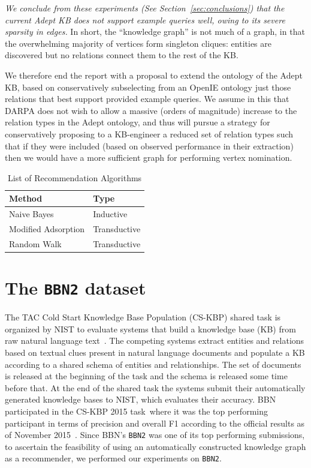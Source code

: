 \documentclass[paper=a4,fontsize=11pt]{scrartcl}
\newcommand{\Secref}[1]{Section~\ref{#1}}
\numberwithin{equation}{section}    %
\numberwithin{figure}{section}      %
\numberwithin{table}{section}       %
\newcommand{\dataset}[0]{\texttt{BBN2} dataset\ }
\newcommand{\task}{CS-KBP 2015 task\ }
\begin{document}
\emph{We conclude from these experiments (See
  \Secref{sec:conclusions}) that the current Adept KB does not support
  example queries well, owing to its severe sparsity in edges.} In
short, the ``knowledge graph'' is not much of a graph, in that the
overwhelming majority of vertices form singleton cliques: entities are
discovered but no relations connect them to the rest of the KB.

We therefore end the report with a proposal to extend the ontology of
the Adept KB, based on conservatively subselecting from an OpenIE
ontology just those relations that best support provided example
queries. We assume in this that DARPA does not wish to allow a
massive (orders of magnitude) increase to the relation types in the
Adept ontology, and thus will pursue a strategy for conservatively
proposing to a KB-engineer a reduced set of relation types such that
if they were included (based on observed performance in their
extraction) then we would have a more sufficient graph for performing
vertex nomination.
\begin{table}[htbp]
  \centering
  \begin{tabular}{l l}
    Method              & Type         \\\hline
    Naive Bayes         & Inductive    \\
    Modified Adsorption & Transductive \\
    Random Walk         & Transductive \\
  \end{tabular}
  \caption{List of Recommendation Algorithms}
  \label{tab:ra}
\end{table}

\section{The \dataset{}}
\label{sec:data}
The TAC Cold Start Knowledge Base Population (CS-KBP) shared task is organized
by NIST to evaluate systems that build a knowledge base (KB) from raw natural
language text~\citep{tac2015cold}. The competing systems extract entities and relations based on
textual clues present in natural language documents and populate a KB according to a shared
schema of entities and relationships. The set of documents is released at the beginning of
the task and the schema is released some time before that.
At the end of the shared task the systems submit their
automatically generated knowledge bases to NIST, which evaluates their accuracy.
BBN participated in the \task where it was the top performing
participant in terms of precision and overall F1 according to the official
results as of November 2015~\citep{bbn2015bonan}. Since BBN's \texttt{BBN2} was one
of its top performing submissions, to ascertain the feasibility of using an
automatically constructed knowledge graph as a recommender, we
performed our experiments on \texttt{BBN2}.
\end{document}
